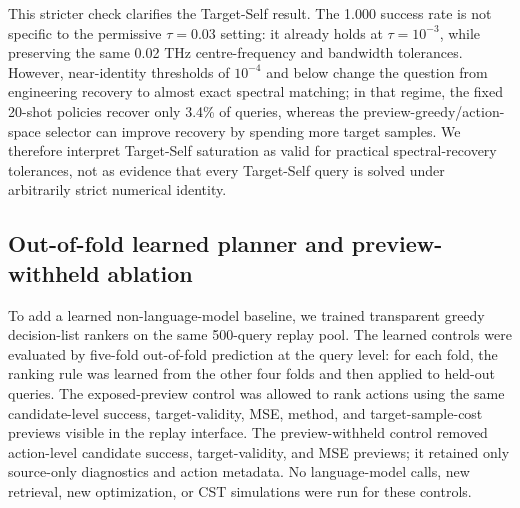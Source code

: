 \documentclass[final,1p,times]{elsarticle}
\begin{document}
This stricter check clarifies the Target-Self result. The 1.000 success rate is not specific to the permissive $\tau=0.03$ setting: it already holds at $\tau=10^{-3}$, while preserving the same 0.02 THz centre-frequency and bandwidth tolerances. However, near-identity thresholds of $10^{-4}$ and below change the question from engineering recovery to almost exact spectral matching; in that regime, the fixed 20-shot policies recover only 3.4\% of queries, whereas the preview-greedy/action-space selector can improve recovery by spending more target samples. We therefore interpret Target-Self saturation as valid for practical spectral-recovery tolerances, not as evidence that every Target-Self query is solved under arbitrarily strict numerical identity.

\subsection{Out-of-fold learned planner and preview-withheld ablation}

To add a learned non-language-model baseline, we trained transparent greedy decision-list rankers on the same 500-query replay pool. The learned controls were evaluated by five-fold out-of-fold prediction at the query level: for each fold, the ranking rule was learned from the other four folds and then applied to held-out queries. The exposed-preview control was allowed to rank actions using the same candidate-level success, target-validity, MSE, method, and target-sample-cost previews visible in the replay interface. The preview-withheld control removed action-level candidate success, target-validity, and MSE previews; it retained only source-only diagnostics and action metadata. No language-model calls, new retrieval, new optimization, or CST simulations were run for these controls.
\end{document}
